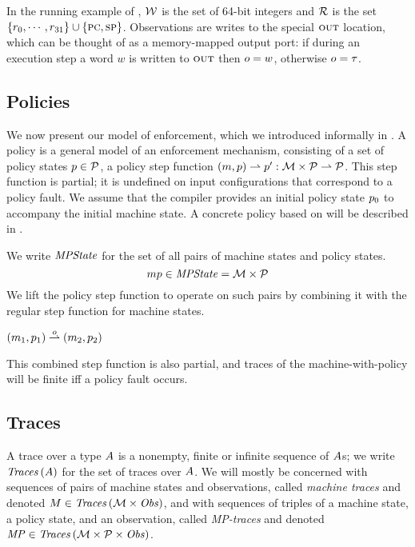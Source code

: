 \documentclass[acmsmall,review,anonymous]{acmart}\settopmatter{printfolios=true,printccs=false,printacmref=false}
\begin{document}
In the running example of ,
${\mathcal W}$ is the
set of 64-bit integers and ${\mathcal R}$ is the set $\{r_0, \cdots, r_{31}\}
\cup \{\textsc{pc},\textsc{sp}\}$. Observations are writes to the
special $\textsc{out}$ location, which can be thought of as a memory-mapped
  output port: if during an execution step a word $w$ is
written to $\textsc{out}$ then $o = w$, otherwise $o = \tau$.

\subsection{Policies}

We now present our model of enforcement, which we introduced
informally in .  A policy is a general model of an
enforcement mechanism, consisting of a set of policy states \(p \in
\mathcal{P}\), a policy step function \((m, p) \rightharpoonup p' :
{\mathcal M} \times \mathcal{P} \rightharpoonup \mathcal{P}\). This step function is partial; 
it is undefined on input configurations that correspond to a policy fault.
We assume that the
compiler provides an initial policy state $p_0$ to accompany
the initial machine state.
%
A concrete policy based on \citet{DBLP:conf/sp/RoesslerD18} will be described in
.

We write $\mathit{MPState}$ for the set of all pairs of machine states and policy
states.
%
\[mp \in \mathit{MPState} = {\mathcal M} \times \mathcal{P}\]
%
We lift the policy step function to operate on such pairs
by combining it with the regular step function for machine states.

            {\((m_1,p_1) \overset{o}{\rightharpoonup}
               (m_2,p_2)\)}

This combined step function is also partial, and traces of the machine-with-policy
will be finite iff a policy fault occurs.

\subsection{Traces}
\label{sec:traces}

A trace over a type $A$ is a nonempty, finite or infinite sequence of
$A$s; we write $\mathit{Traces}\,(A)$ for the set of traces over
$A$. We will mostly be concerned with sequences of pairs of
machine states
and observations, called \emph{machine traces} and denoted $M \in \mathit{Traces}\,({\mathcal M} \times \mathit{Obs})$,
and with sequences of triples of a machine state, a policy state, and an
observation, called \emph{MP-traces} and denoted $\mathit{MP} \in \mathit{Traces}\,({\mathcal M} \times \mathcal{P} \times \mathit{Obs})$.
\end{document}
